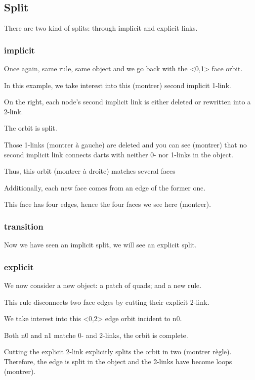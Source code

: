 \documentclass[11pt]{article}
\begin{document}
\subsection{Split}
\label{sec:org13cd45e}
There are two kind of splits: through implicit and explicit links.

\subsubsection{implicit}
\label{sec:org7d182d4}
Once again, same rule, same object and we go back with the <0,1> face orbit.

In this example, we take interest into this (montrer) second implicit 1-link.

On the right, each node's second implicit link is either deleted or rewritten
into a 2-link.

The orbit is split.

Those 1-links (montrer à gauche) are deleted and you can see (montrer) that no
second implicit link connects darts with neither 0- nor 1-links in the object.

Thus, this orbit (montrer à droite) matches several faces

Additionally, each new face comes from an edge of the former one.

This face has four edges, hence the four faces we see here (montrer).

\subsubsection{transition}
\label{sec:org5a88e58}

Now we have seen an implicit split, we will see an explicit split.

\subsubsection{explicit}
\label{sec:orge2f0155}
We now consider a new object: a patch of quads; and a new rule.

This rule disconnects two face edges by cutting their explicit 2-link.

We take interest into this <0,2> edge orbit incident to n0.

Both n0 and n1 matche 0- and 2-links, the orbit is complete.

Cutting the explicit 2-link explicitly splits the orbit in two (montrer règle).
Therefore, the edge is split in the object and the 2-links have become loops
(montrer).
\end{document}
